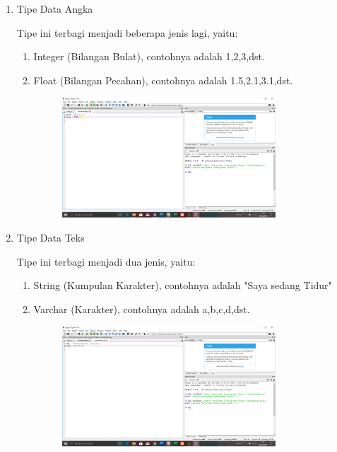 \documentclass{article}
\begin{document}
    \begin{enumerate}
        \item Tipe Data Angka
            \par Tipe ini terbagi menjadi beberapa jenis lagi, yaitu:
            \par \begin{enumerate}
                \item Integer (Bilangan Bulat), contohnya adalah 1,2,3,dst.
                \item Float (Bilangan Pecahan), contohnya adalah 1.5,2.1,3.1,dst.
                \begin{figure}[h]
                    \centerline{\includegraphics[width=8cm]{figures/tipedataangka.png}}
                \end{figure}
            \end{enumerate}
        \item Tipe Data Teks 
            \par Tipe ini terbagi menjadi dua jenis, yaitu:
            \par \begin{enumerate}
                \item String (Kumpulan Karakter), contohnya adalah "Saya sedang Tidur"
                \item Varchar (Karakter), contohnya adalah a,b,c,d,dst.
                \begin{figure}[h]
                \centerline{\includegraphics[width=8cm]{figures/tipedatastring.png}}
            \end{figure}
            \end{enumerate}

\end{enumerate}
\end{document}
